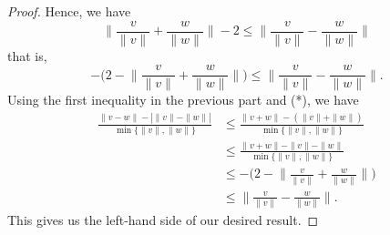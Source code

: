 \documentclass[a4paper]{article}
\begin{document}
\begin{enumerate}
\begin{proof}
        Hence, we have 
        \[  \Big\|\frac{ v }{ \|v\|  }  + \frac{ w }{ \|w\| } \Big\| - 2 \leq \Big\| \frac{ v }{ \|v\|  }  - \frac{ w }{ \|w\| } \Big\| \]
        that is,
        \[  - \Big(  2 - \Big\| \frac{ v }{ \|v\| }  + \frac{ w }{ \|w\| } \Big\| \Big)  \leq \Big\|\frac{ v }{ \|v\| }  - \frac{ w }{ \|w\| } \Big\|. \tag{*} \]
        Using the first inequality in the previous part and (*), we have 
        \begin{align*}
            \frac{ \|v - w \| - | \|v\| - \|w\| |  }{ \min \{ \|v\|, \|w\| \}  } &\leq \frac{ \|v + w \| - (\|v\| + \|w\|) }{  \min \{ \|v\|, \|w\| \}  }  \\
                                                                                 &\leq \frac{ \|v + w \| - \|v\| - \|w\| }{ \min \{ \|v\|, \|w\| \}  } \\
                                                                                 &\leq - \Big(  2 - \Big\|\frac{ v }{ \|v\| }  + \frac{ w }{ \|w\| } \Big\| \Big) \\
                                                                                 &\leq \Big\|\frac{ v }{ \|v\| }  - \frac{ w }{ \|w\| } \Big\|.
        \end{align*}
        This gives us the left-hand side of our desired result.


\end{proof}
\end{enumerate}
\end{document}
